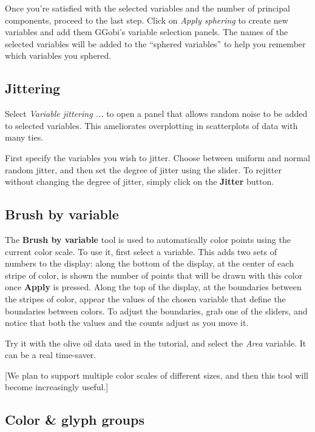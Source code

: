 \documentclass[11pt]{article}
\begin{document}
Once you're satisfied with the selected variables and the number of
principal components, proceed to the last step.  Click on {\em Apply
sphering} to create new variables and add them GGobi's variable selection
panels.  The names of the selected variables will be added to the
``sphered variables'' to help you remember which variables you sphered.

\subsection{Jittering}

Select {\em Variable jittering ...} to open a panel that allows
random noise to be added to selected variables.  This ameliorates
overplotting in scatterplots of data with many ties.

First specify the variables you wish to jitter.  Choose between uniform
and normal random jitter, and then set the degree of jitter using the
slider.  To rejitter without changing the degree of jitter, simply click
on the {\bf Jitter} button.

\subsection{Brush by variable}
\label{slbl:BrushByVariable}

The {\bf Brush by variable} tool is used to automatically color points
using the current color scale.  To use it, first select a variable.
This adds two sets of numbers to the display:  along the bottom of the
display, at the center of each stripe of color, is shown the number of
points that will be drawn with this color once {\bf Apply} is pressed.
Along the top of the display, at the boundaries between the stripes of
color, appear the values of the chosen variable that define the boundaries
between colors.  To adjust the boundaries, grab one of the sliders,
and notice that both the values and the counts adjust as you move it.

Try it with the olive oil data used in the tutorial, and select the {\it
Area} variable.  It can be a real time-saver.

[We plan to support multiple color scales of different sizes, and then
this tool will become increasingly useful.]

\subsection{Color \& glyph groups}
\label{slbl:ColorAndGlyphGroups}
\end{document}
